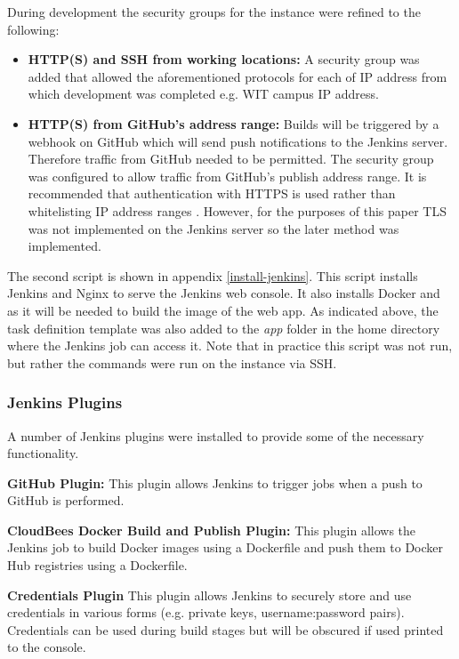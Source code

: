 	During development the security groups for the instance were refined to the following:
	\begin{itemize}
		\item \textbf{HTTP(S) and SSH from working locations:} A security group was added that allowed the aforementioned protocols for each of IP address from which development was completed e.g. WIT campus IP address.
		\item \textbf{HTTP(S) from GitHub's address range:} Builds will be triggered by a webhook on GitHub which will send push notifications to the Jenkins server. Therefore traffic from GitHub needed to be permitted. The security group was configured to allow traffic from GitHub's publish address range. It is recommended that authentication with HTTPS is used rather than whitelisting IP address ranges \citep{github}. However, for the purposes of this paper TLS was not implemented on the Jenkins server so the later method was implemented.
	\end{itemize}
	
	The second script is shown in appendix \autoref{install-jenkins}. This script installs Jenkins and Nginx to serve the Jenkins web console. It also installs Docker and as it will be needed to build the image of the web app. As indicated above, the task definition template was also added to the \textit{app} folder in the home directory where the Jenkins job can access it. Note that in practice this script was not run, but rather the commands were run on the instance via SSH.

	\subsubsection{Jenkins Plugins}
		A number of Jenkins plugins were installed to provide some of the necessary functionality.
		
		\medbreak
		\noindent \textbf{GitHub Plugin:} This plugin allows Jenkins to trigger jobs when a push to GitHub is performed.
		
		\medbreak	
		\noindent \textbf{CloudBees Docker Build and Publish Plugin:} This plugin allows the Jenkins job to build Docker images using a Dockerfile and push them to Docker Hub registries using a Dockerfile.
		
		\medbreak
		\noindent \textbf{Credentials Plugin} This plugin allows Jenkins to securely store and use credentials in various forms (e.g. private keys, username:password pairs). Credentials can be used during build stages but will be obscured if used printed to the console.
		
